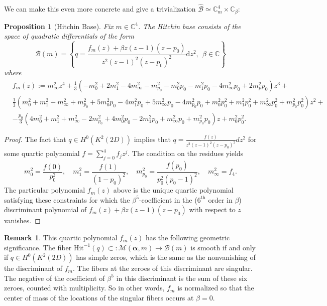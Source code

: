 \documentclass[12pt,letterpaper,reqno]{amsart}
\def\mathbf#1{#1}%
\newtheorem{prop}[thm]{Proposition}
\theoremstyle{remark}
\theoremstyle{definition}
\newtheorem{rem}[thm]{Remark}
\numberwithin{thm}{section}
\numberwithin{equation}{section}
\numberwithin{figure}{section}
\newcommand{\cB}{\ensuremath{\mathcal B}}
\newcommand{\C}{\ensuremath{\mathbb C}}
\newcommand{\calB}{\mathcal B}
\newcommand{\calM}{\mathcal M}
\newcommand{\de}{\mathrm{d}}
\newcommand{\bsa}{\boldsymbol{\alpha}}
\newcommand{\bfm}{\mathbf{m}}
\begin{document}
We can make this even more concrete and give a trivialization $\widehat{\mathcal{B}} \simeq \C^4_{\mathbf{m}} \times \C_{\beta}$:
\begin{prop} [Hitchin Base] \label{prop:Hitchinbase}
Fix $\mathbf{m} \in \C^4$. 
The Hitchin base consists of the space of quadratic differentials of the form
\begin{equation}
 \cB(\mathbf{m}) =\left\{q=\frac{f_{\mathbf{m}}(z) + \beta z(z-1)(z-p_0)}{z^2(z-1)^2 (z-p_0)^2} \de z^2,\ \ \beta \in \C\right\} 
\end{equation}
where 
\begin{align*}
& f_{\mathbf{m}}(z):= 
m_\infty^2 z^4 + \frac{1}{3} (-m_0^2+2 m_1^2-4 m_\infty^2-m_{p_0}^2-m_{0}^2 p_0-m_1^2 p_0-4 m_{\infty}^2 p_0+2 m_p^2 p_0) z^3+ \\
& \frac{1}{3}(m_0^2+m_1^2+m_\infty^2+m_{p_0}^2+5 m_0^2 p_0-4 m_1^2 p_0+5 m_\infty^2 p_0-4 m_{p_0}^2 p_0+m_0^2 p_0^2+m_1^2 p_0^2+m_\infty^2 p_0^2+m_{p_0}^2 p_0^2) z^2+\\ & -\frac{p_0}{3}  (4 m_0^2+m_1^2+m_\infty^2-2 m_{p_0}^2+4 m_0^2 p_0-2 m_1^2 p_0+m_\infty^2 p_0+m_{p_0}^2 p_0) z + m_0^2 p_0^2.
\end{align*}
\end{prop}
\begin{proof}  The fact that $q \in H^0(K^2(2D))$ implies that $q = \frac{f(z)}{z^2(z-1)^2(z-p_0)^2} dz^2$ for some quartic polynomial $f = \sum_{j=0}^4 f_j z^j$. 
The condition on the residues yields 
\begin{equation} \label{eq:complexmass}
 m_0^2 = \frac{f(0)}{p_0^2}, \quad  m_1^2 = \frac{f(1)}{(1-p_0)^2},  \quad m_{p_0}^2 = \frac{f(p_0)}{p_0^2(p_0-1)^2}, \quad m_\infty^2 = f_4.
\end{equation}
The particular polynomial $f_{\mathbf{m}}(z)$ above is the unique quartic polynomial satisfying these constraints for which the $\beta^5$-coefficient in 
the ($6^{\mathrm{th}}$ order in $\beta$) discriminant polynomial of $f_{\mathbf{m}}(z) + \beta z(z-1)(z-p_0)$ with respect to $z$ vanishes. 
\end{proof}
\begin{rem}
This quartic polynomial $f_{\mathbf{m}}(z)$ has the following geometric significance. The fiber $\mathrm{Hit}^{-1}(q) \subset: \calM(\bsa,\bfm)  \to \calB(\bfm)$
is smooth if and only if $q \in H^0(K^2(2D))$ has simple zeros, which is the same as the nonvanishing of the discriminant  of $f_{\bfm}$.  The fibers at the
zeroes of this discriminant are singular. The negative of the coefficient of $\beta^5$ in this discriminant is the sum of these six zeroes, counted 
with multiplicity. So in other words, $f_{\bfm}$ is normalized so that the center of mass of the locations of the singular fibers occurs at $\beta = 0$.
\end{rem}
\end{document}
